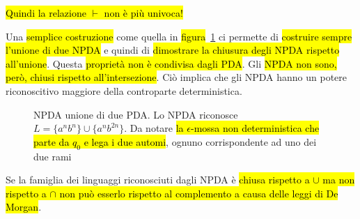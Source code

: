 \documentclass[a4paper,11pt,oneside]{article}
\theoremstyle{plain}
\theoremstyle{definition}
\theoremstyle{remark}
\begin{document}
\hl{Quindi la relazione $\vdash$ non è più univoca!}

Una \hl{semplice costruzione} come quella in \hl{figura}~\ref{fig:npda-unione}
ci permette di \hl{costruire sempre l'unione di due NPDA} e quindi di
\hl{dimostrare la chiusura degli NPDA rispetto all'unione}. Questa \hl{proprietà
non è condivisa dagli PDA}\@. Gli \hl{NPDA non sono, però, chiusi rispetto
all'intersezione}. Ciò implica che gli NPDA hanno un potere riconoscitivo
maggiore della controparte deterministica.

\begin{figure}[htb]
  \centering
  \caption{NPDA unione di due PDA\@. Lo NPDA riconosce $L = \{a^n b^n\} \cup
  \{a^n b^{2n}\}$. Da notare \hl{la $\epsilon$-mossa non deterministica che
  parte da $q_0$ e lega i due automi}, ognuno corrispondente ad uno dei due
  rami}%
  \label{fig:npda-unione}
\end{figure}

Se la famiglia dei linguaggi riconosciuti dagli NPDA è \hl{chiusa rispetto a
$\cup$ ma non rispetto a $\cap$ non può esserlo rispetto al complemento a causa
delle leggi di De Morgan}.
\end{document}
